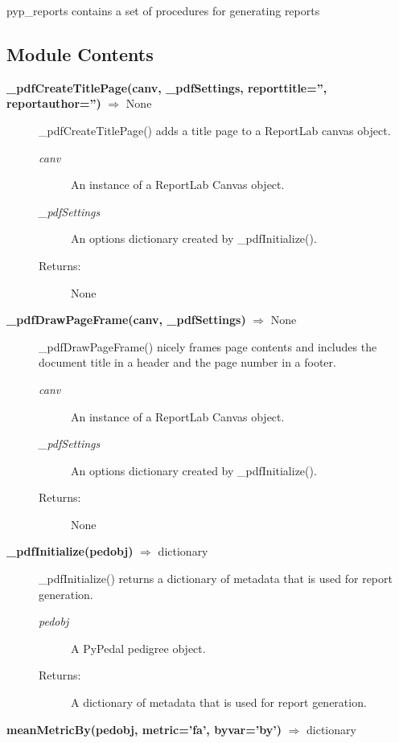 pyp\_reports contains a set of procedures for generating reports
\label{sec:pyp-reports}
\subsection*{Module Contents}
\begin{description}
\item[\textbf{\_pdfCreateTitlePage(canv, \_pdfSettings, reporttitle='', reportauthor='')} $\Rightarrow$ None]
\label{sec:pyp-reports-pdf-create-title-page}
\_pdfCreateTitlePage() adds a title page to a ReportLab canvas object.
\begin{description}
\item[\emph{canv}] An instance of a ReportLab Canvas object.
\item[\emph{\_pdfSettings}] An options dictionary created by \_pdfInitialize().
\label{sec:pyp-reports-pdf-settings}
\item[Returns:] None
\end{description}
\item[\textbf{\_pdfDrawPageFrame(canv, \_pdfSettings)} $\Rightarrow$ None]
\_pdfDrawPageFrame() nicely frames page contents and includes the document title in a header and the page number in a footer.
\label{sec:pyp-reports-pdf-draw-page-frame}
\begin{description}
\item[\emph{canv}] An instance of a ReportLab Canvas object.
\item[\emph{\_pdfSettings}] An options dictionary created by \_pdfInitialize().
\item[Returns:] None
\end{description}
\item[\textbf{\_pdfInitialize(pedobj)} $\Rightarrow$ dictionary]
\_pdfInitialize() returns a dictionary of metadata that is used for report generation.
\label{sec:pyp-reports-pdf-initialize}
\begin{description}
\item[\emph{pedobj}] A PyPedal pedigree object.
\item[Returns:] A dictionary of metadata that is used for report generation.
\end{description}
\item[\textbf{meanMetricBy(pedobj, metric='fa', byvar='by')} $\Rightarrow$ dictionary]

\end{description}

